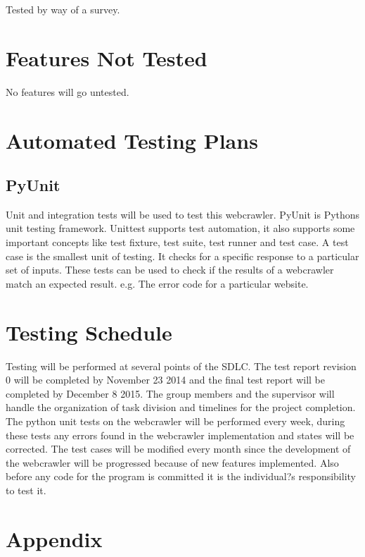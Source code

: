 \documentclass[12pt, titlepage]{article}
\begin{document}
Tested by way of a survey.


\section{Features Not Tested}
No features will go untested.


\section{Automated Testing Plans}
\subsection{PyUnit}
Unit and integration tests will be used to test this webcrawler. PyUnit is Python\textsc{}s unit testing framework. Unittest supports test automation, it also supports some important concepts like test fixture, test suite, test runner and test case. A test case is the smallest unit of testing. It checks for a specific response to a particular set of inputs.  These tests can be used to check if the results of a webcrawler match an expected result. e.g. The error code for a particular website.

\section{Testing Schedule}
Testing will be performed at several points of the SDLC.  The test report revision 0 will be completed by November 23 2014 and the final test report will be completed by December 8 2015. The group members and the supervisor will handle the organization of task division and timelines for the project completion. The python unit tests on the webcrawler will be performed every week, during these tests any errors found in the webcrawler implementation and states will be corrected. The test cases will be modified every month since the development of the webcrawler will be progressed because of new features implemented. Also before any code for the program is committed it is the individual?s responsibility to test it.


\section{Appendix}
\end{document}
